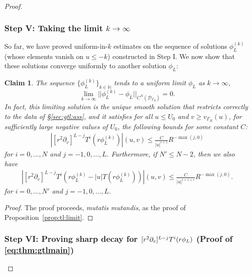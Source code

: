 \documentclass[11pt,english]{article}
\numberwithin{equation}{section}
\theoremstyle{remark}
\theoremstyle{plain}
\newtheorem{claim}{Claim}
\theoremstyle{remark}
\newcommand{\pv}{\partial_v}
\renewcommand{\(}{\left(}
\renewcommand{\)}{\right)}
\begin{document}
\begin{proof}
\subsubsection*{Step V: Taking the limit $k\to\infty$}
So far, we have proved uniform-in-$k$ estimates on the sequence of solutions $\phi_L^{(k)}$ (whose elements vanish on $u\leq -k$) constructed in Step I. We now show that these solutions converge uniformly to another solution $\phi_L$:
\begin{claim}\label{claim6}
The sequence $\{\phi_L^{(k)}\}_{k\in\mathbb{N}}$ tends to a uniform limit $\phi_L$ as $k\to\infty$,
\begin{equation}
\lim_{k\to\infty}||\phi_L^{(k)}-\phi_L 	||_{C^N(\mathcal{D}_{\Gamma_R})}=0.
\end{equation}
In fact, this limiting solution is the unique smooth solution that restricts correctly to the data of \S \ref{sec:gtl:ass}, and it satisfies for all $u\leq U_0$ and $v\geq v_{\Gamma_R}(u)$, for sufficiently large negative values of $U_0$, the following bounds for some constant $C$:
	\begin{align}
	\left|[r^2\pv]^{L-j}T^i(r\phi^{(k)}_L)\right|(u,v)\leq \frac{C}{|u|^{i+1}}R^{-\max{(j,0)}}
	\end{align}
	for $i=0,\dots, N$ and $j=-1,0,\dots, L$. Furthermore, if $N'\leq N-2$, then we also have
	\begin{align}\label{eq:proof:gtl:claim6}
	\left|[r^2\pv]^{L-j}T^i(r\phi^{(k)}_L-|u|T(r\phi^{(k)}_L))\right|(u,v)\leq \frac{C}{|u|^{i+1+\epsilon}}R^{	-\max(j,0)}.
	\end{align} for $i=0,\dots,N'$ and $j=-1,0, \dots, L$.
\end{claim}
\begin{proof}
The proof proceeds, \textit{mutatis mutandis}, as the proof of Proposition~\ref{prop:tl:limit}.
\end{proof}

\subsubsection*{Step VI: Proving sharp decay for $\pvx{L-j} T^i(r\phi_L)$ (Proof of \eqref{eq:thm:gtlmain})}


\end{proof}
\end{document}
